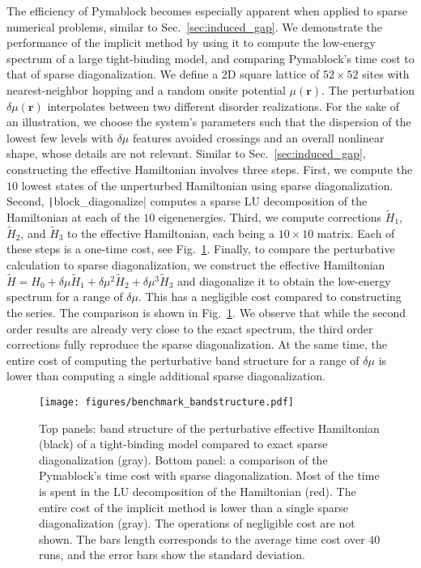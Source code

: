 The efficiency of Pymablock becomes especially apparent when applied to sparse numerical problems, similar to Sec.~\ref{sec:induced_gap}.
We demonstrate the performance of the implicit method by using it to compute the low-energy spectrum of a large tight-binding model, and comparing Pymablock's time cost to that of sparse diagonalization.
We define a 2D square lattice of $52 \times 52$ sites with nearest-neighbor hopping and a random onsite potential $\mu(\mathbf{r})$.
The perturbation $\delta \mu (\mathbf{r})$ interpolates between two different disorder realizations.
For the sake of an illustration, we choose the system's parameters such that the dispersion of the lowest few levels with $\delta \mu$ features avoided crossings and an overall nonlinear shape, whose details are not relevant.
Similar to Sec.~\ref{sec:induced_gap}, constructing the effective Hamiltonian involves three steps.
First, we compute the $10$ lowest states of the unperturbed Hamiltonian using sparse diagonalization.
Second, \texttt|block_diagonalize| computes a sparse LU decomposition of the Hamiltonian at each of the $10$ eigenenergies.
Third, we compute corrections $\tilde{H}_1$, $\tilde{H}_2$, and $\tilde{H}_3$ to the effective Hamiltonian, each being a $10 \times 10$ matrix.
Each of these steps is a one-time cost, see Fig.~\ref{fig:benchmark_bandstructure}.
Finally, to compare the perturbative calculation to sparse diagonalization, we construct the effective Hamiltonian $\tilde{H} = H_0 + \delta \mu \tilde{H}_1 + \delta \mu^2 \tilde{H}_2 + \delta \mu^3 \tilde{H}_3$ and diagonalize it to obtain the low-energy spectrum for a range of $\delta \mu$.
This has a negligible cost compared to constructing the series.
The comparison is shown in Fig.~\ref{fig:benchmark_bandstructure}.
We observe that while the second order results are already very close to the exact spectrum, the third order corrections fully reproduce the sparse diagonalization.
At the same time, the entire cost of computing the perturbative band structure for a range of $\delta \mu$ is lower than computing a single additional sparse diagonalization.
%
\begin{figure}[h]
    \centering
    \texttt{[image: figures/benchmark\_bandstructure.pdf]}
    \caption{
        Top panels: band structure of the perturbative effective Hamiltonian (black) of a tight-binding model compared to exact sparse diagonalization (gray).
        Bottom panel: a comparison of the Pymablock's time cost with sparse diagonalization.
        Most of the time is spent in the LU decomposition of the Hamiltonian (red).
        The entire cost of the implicit method is lower than a single sparse diagonalization (gray).
        The operations of negligible cost are not shown.
        The bars length corresponds to the average time cost over $40$ runs, and the error bars show the standard deviation.
        }
    \label{fig:benchmark_bandstructure}
\end{figure}
